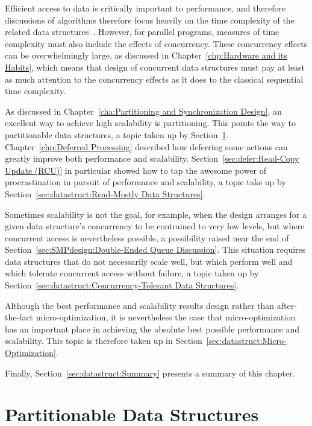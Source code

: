 

Efficient access to data is critically important to performance, and
therefore discussions of algorithms therefore focus heavily on the
time complexity of the related
data structures~\cite{ThomasHCorman2001Algorithms}.
However, for parallel programs, measures of time complexity must also
include the effects of concurrency.
These concurrency effects can be overwhelmingly large, as discussed in
Chapter~\ref{chp:Hardware and its Habits}, which means that design of
concurrent data structures must pay at least as much attention to the
concurrency effects as it does to the classical sequential time
complexity.

As discussed in Chapter~\ref{cha:Partitioning and Synchronization Design},
an excellent way to achieve high scalability is partitioning.
This points the way to partitionable data structures, a topic taken up by
Section~\ref{sec:datastruct:Partitionable Data Structures}.
Chapter~\ref{chp:Deferred Processing} described how deferring some
actions can greatly improve both performance and scalability.
Section~\ref{sec:defer:Read-Copy Update (RCU)} in particular showed
how to tap the awesome power of procrastination in pursuit of
performance and scalability, a topic take up by
Section~\ref{sec:datastruct:Read-Mostly Data Structures}.

Sometimes scalability is not the goal, for example, when the design
arranges for a given data structure's concurrency to be contrained
to very low levels, but where concurrent access is nevertheless
possible, a possibility raised near the end of
Section~\ref{sec:SMPdesign:Double-Ended Queue Discussion}.
This situation requires data structures that do not necessarily scale
well, but which perform well and which tolerate concurrent access
without failure, a topic taken up by
Section~\ref{sec:datastruct:Concurrency-Tolerant Data Structures}.

Although the best performance and scalability results design rather
than after-the-fact micro-optimization, it is nevertheless the case
that micro-optimization has an important place in achieving the
absolute best possible performance and scalability.
This topic is therefore taken up in
Section~\ref{sec:datastruct:Micro-Optimization}.

Finally, Section~\ref{sec:datastruct:Summary}
presents a summary of this chapter.

\section{Partitionable Data Structures}
\label{sec:datastruct:Partitionable Data Structures}

